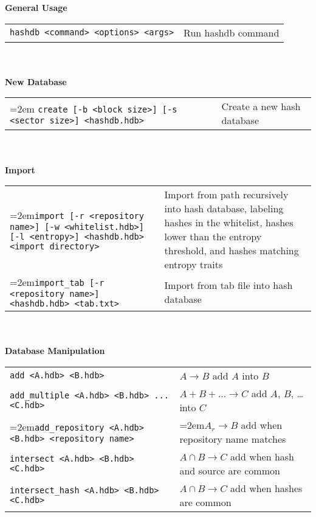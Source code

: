 \begin{footnotesize}
\textbf{General Usage} \\
\begin{tabular}{p{3.6 in} p{3.0 in}}
\texttt{hashdb <command> <options> <args>} & Run hashdb command \\
\end{tabular}
\\
\\
\textbf{New Database} \\
\begin{tabular}{p{3.6 in} p{3.0 in}}
\hangindent=2em \texttt{create [-b <block size>] [-s <sector size>] <hashdb.hdb>} &
Create a new hash database \\
\end{tabular}
\\
\\
\textbf{Import} \\
\begin{tabular}{p{3.6 in} p{3.0 in}}
\hangindent=2em\texttt{import [-r <repository name>] [-w <whitelist.hdb>] [-l <entropy>] <hashdb.hdb> <import directory>} &
Import from path recursively into hash database, labeling hashes in the whitelist, hashes lower than the entropy threshold, and hashes matching entropy traits \\
\hangindent=2em\texttt{import\_tab [-r <repository name>] <hashdb.hdb> <tab.txt>} &
Import from tab file into hash database \\
\end{tabular}
\\
\\
\textbf{Database Manipulation} \\
\begin{tabular}{p{3.6 in} p{3.0 in}}
\texttt{add <A.hdb> <B.hdb>} & $A \rightarrow B$ add $A$ into $B$ \\
\texttt{add\_multiple <A.hdb> <B.hdb> ... <C.hdb>} & $A + B + \ldots \rightarrow C$ add $A$, $B$, \ldots into $C$\\
\hangindent=2em\texttt{add\_repository <A.hdb> <B.hdb> <repository name>} & \hangindent=2em$A_r \rightarrow B$ add when repository name matches \\
\texttt{intersect <A.hdb> <B.hdb> <C.hdb>} & $A \cap B \rightarrow C$ add when hash and source are common\\
\texttt{intersect\_hash <A.hdb> <B.hdb> <C.hdb>} & $A \cap B \rightarrow C$ add when hashes are common\\

\end{tabular}
\end{footnotesize}
